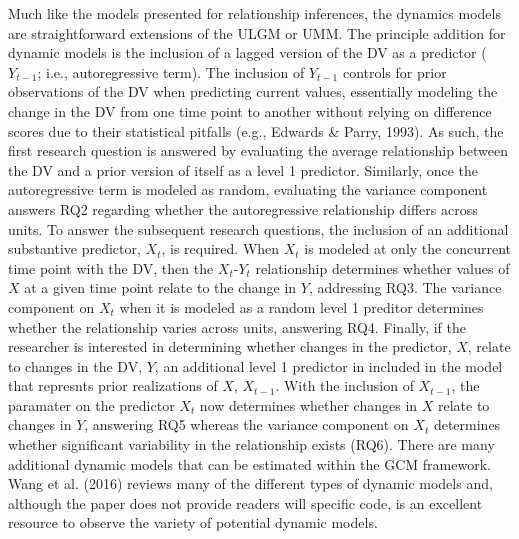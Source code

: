 \documentclass[english,,man]{apa6}
\theoremstyle{definition}
\theoremstyle{definition}
\theoremstyle{definition}
\theoremstyle{remark}
\begin{document}
Much like the models presented for relationship inferences, the dynamics
models are straightforward extensions of the ULGM or UMM. The principle
addition for dynamic models is the inclusion of a lagged version of the
DV as a predictor (\(Y_{t-1}\); i.e., autoregressive term). The
inclusion of \(Y_{t-1}\) controls for prior observations of the DV when
predicting current values, essentially modeling the change in the DV
from one time point to another without relying on difference scores due
to their statistical pitfalls (e.g., Edwards \& Parry, 1993). As such,
the first research question is answered by evaluating the average
relationship between the DV and a prior version of itself as a level 1
predictor. Similarly, once the autoregressive term is modeled as random,
evaluating the variance component answers RQ2 regarding whether the
autoregressive relationship differs across units. To answer the
subsequent research questions, the inclusion of an additional
substantive predictor, \(X_t\), is required. When \(X_t\) is modeled at
only the concurrent time point with the DV, then the \(X_t\)-\(Y_t\)
relationship determines whether values of \(X\) at a given time point
relate to the change in \(Y\), addressing RQ3. The variance component on
\(X_t\) when it is modeled as a random level 1 preditor determines
whether the relationship varies across units, answering RQ4. Finally, if
the researcher is interested in determining whether changes in the
predictor, \(X\), relate to changes in the DV, \(Y\), an additional
level 1 predictor in included in the model that represnts prior
realizations of \(X\), \(X_{t-1}\). With the inclusion of \(X_{t-1}\),
the paramater on the predictor \(X_t\) now determines whether changes in
\(X\) relate to changes in \(Y\), answering RQ5 whereas the variance
component on \(X_t\) determines whether significant variability in the
relationship exists (RQ6). There are many additional dynamic models that
can be estimated within the GCM framework. Wang et al. (2016) reviews
many of the different types of dynamic models and, although the paper
does not provide readers will specific code, is an excellent resource to
observe the variety of potential dynamic models.
\end{document}
